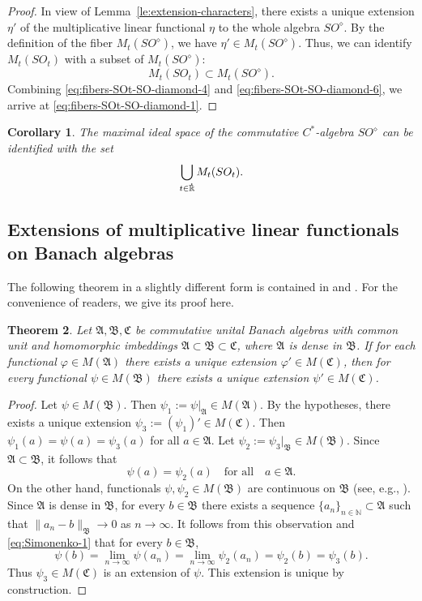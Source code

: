\documentclass{birkjour}
\newtheorem{theorem}{Theorem}[section]
\newtheorem{corollary}[theorem]{Corollary}
\numberwithin{equation}{section}
\newcommand{\N}{\mathbb{N}}
\newcommand{\R}{\mathbb{R}}
\newcommand{\fA}{\mathfrak{A}}
\newcommand{\fB}{\mathfrak{B}}
\newcommand{\fC}{\mathfrak{C}}
\newcommand{\dR}{{\bf\dot{\R}}}
\begin{document}
\begin{proof}
In view of Lemma~\ref{le:extension-characters}, there exists a unique
extension $\eta'$ of the multiplicative linear functional $\eta$ to the whole
algebra $SO^\diamond$. By the definition of the fiber $M_t(SO^\diamond)$, we
have $\eta'\in M_t(SO^\diamond)$. Thus, we can identify $M_t(SO_t)$ with a
subset of $M_t(SO^\diamond)$:
\begin{equation}\label{eq:fibers-SOt-SO-diamond-6}
M_t(SO_t)\subset M_t(SO^\diamond).
\end{equation}
Combining \eqref{eq:fibers-SOt-SO-diamond-4} and
\eqref{eq:fibers-SOt-SO-diamond-6}, we arrive at
\eqref{eq:fibers-SOt-SO-diamond-1}.
\end{proof}
\begin{corollary}
The maximal ideal space of the commutative $C^*$-algebra $SO^\diamond$
can be identified with the set
\[
\bigcup_{t\in\dR}M_t(SO_t).
\]
\end{corollary}
\subsection{Extensions of multiplicative linear functionals on Banach algebras}
The following theorem in a slightly different form is contained in
\cite[Theorem~2.1.1]{S07} and \cite[Theorem~3.10]{SM86}. For the convenience
of readers, we give its proof here.
\begin{theorem}\label{th:Simonenko}
Let $\fA,\fB,\fC$ be commutative unital Banach algebras with common unit
and homomorphic imbeddings $\fA\subset\fB\subset\fC$, where $\fA$ is dense
in $\fB$. If for each functional $\varphi\in M(\fA)$ there exists a unique
extension $\varphi'\in M(\fC)$, then for every functional $\psi\in M(\fB)$
there exists a unique extension $\psi'\in M(\fC)$.
\end{theorem}
\begin{proof}
Let $\psi\in M(\fB)$. Then $\psi_1:=\psi|_{\fA}\in M(\fA)$. By the
hypotheses, there exists a unique extension $\psi_3:=(\psi_1)'\in M(\fC)$.
Then $\psi_1(a)=\psi(a)=\psi_3(a)$ for all $a\in\fA$. Let $\psi_2:=
\psi_3|_\fB\in M(\fB)$. Since $\fA\subset\fB$, it follows that
\begin{equation}\label{eq:Simonenko-1}
\psi(a)=\psi_2(a)\quad\mbox{for all}\quad a\in\fA.
\end{equation}
On the other hand, functionals $\psi,\psi_2\in M(\fB)$ are continuous on
$\fB$ (see, e.g., \cite[Lemma~2.1.5]{K09}). Since $\fA$ is dense in $\fB$,
for every $b\in\fB$ there exists a sequence $\{a_n\}_{n\in\N}\subset\fA$
such that $\|a_n-b\|_\fB\to 0$ as $n\to\infty$.
It follows from this observation and \eqref{eq:Simonenko-1} that for every
$b\in\fB$,
\[
\psi(b)=\lim_{n\to\infty}\psi(a_n)=\lim_{n\to\infty}\psi_2(a_n)=\psi_2(b)
=\psi_3(b).
\]
Thus $\psi_3\in M(\fC)$ is an extension of $\psi$. This extension is unique
by construction.
\end{proof}
\end{document}
